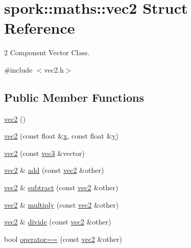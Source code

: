 \hypertarget{structspork_1_1maths_1_1vec2}{}\section{spork\+:\+:maths\+:\+:vec2 Struct Reference}
\label{structspork_1_1maths_1_1vec2}


2 Component Vector Class.  




{\ttfamily \#include $<$vec2.\+h$>$}

\subsection*{Public Member Functions}
\begin{DoxyCompactItemize}
\item 
\hyperlink{structspork_1_1maths_1_1vec2_a5d5b62cb2ba5a5234c0f4e5f122f94da}{vec2} ()
\item 
\hyperlink{structspork_1_1maths_1_1vec2_adb68c59e392ee34362cbe8cf6a710a24}{vec2} (const float \&\hyperlink{structspork_1_1maths_1_1vec2_a9101ec8c3e2125983dc92dfc33df946b}{x}, const float \&\hyperlink{structspork_1_1maths_1_1vec2_a9fb4d0466eed13ffa264cdcb7239f10d}{y})
\item 
\hyperlink{structspork_1_1maths_1_1vec2_af24f57ecb7df42f271aeac5464b5777f}{vec2} (const \hyperlink{structspork_1_1maths_1_1vec3}{vec3} \&vector)
\item 
\hyperlink{structspork_1_1maths_1_1vec2}{vec2} \& \hyperlink{structspork_1_1maths_1_1vec2_a22e7e6448259f6c6e94e3d1412b31746}{add} (const \hyperlink{structspork_1_1maths_1_1vec2}{vec2} \&other)
\item 
\hyperlink{structspork_1_1maths_1_1vec2}{vec2} \& \hyperlink{structspork_1_1maths_1_1vec2_a0a921e9113514d93f0a4b27956d5d9d6}{subtract} (const \hyperlink{structspork_1_1maths_1_1vec2}{vec2} \&other)
\item 
\hyperlink{structspork_1_1maths_1_1vec2}{vec2} \& \hyperlink{structspork_1_1maths_1_1vec2_a6269af13cf61c95353e10a5823874f0c}{multiply} (const \hyperlink{structspork_1_1maths_1_1vec2}{vec2} \&other)
\item 
\hyperlink{structspork_1_1maths_1_1vec2}{vec2} \& \hyperlink{structspork_1_1maths_1_1vec2_a231f74d0f552909877f68fe0874f8692}{divide} (const \hyperlink{structspork_1_1maths_1_1vec2}{vec2} \&other)
\item 
bool \hyperlink{structspork_1_1maths_1_1vec2_ad0fe5fad19950766a3ca03d605e435d1}{operator==} (const \hyperlink{structspork_1_1maths_1_1vec2}{vec2} \&other)

\end{DoxyCompactItemize}
